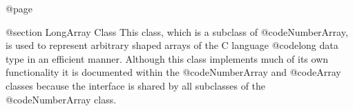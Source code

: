 @page

@section  LongArray Class
This class, which is a subclass of @code{NumberArray}, is used to
represent arbitrary shaped arrays of the C language @code{long} data
type in an efficient manner.  Although this class implements much of its
own functionality it is documented within the @code{NumberArray} and
@code{Array} classes because the interface is shared by all subclasses
of the @code{NumberArray} class.







